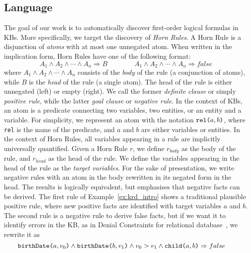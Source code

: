 \subsection{Language} \label{sec:krd_language} 
The goal of our work is to automatically discover first-order logical formulas in KBs. More specifically, we target the discovery of \emph{Horn Rules}. A Horn Rule is a disjunction of \emph{atoms} with at most one unnegated atom. When written in the implication form, Horn Rules have one of the following format:
%
\begin{equation*}
A_1 \wedge A_2 \wedge \cdots \wedge A_n \Rightarrow B \qquad \qquad A_1 \wedge A_2 \wedge \cdots \wedge A_n \Rightarrow  false 
\end{equation*} %
%
where $A_1 \wedge A_2 \wedge \cdots \wedge A_n$ consists of the \emph{body} of the rule (a conjunction of atoms), while $B$ is the \emph{head} of the rule (a single atom). The head of the rule is either unnegated (left) or empty (right). We call the former \emph{definite clause} or simply \emph{positive rule}, while the latter \emph{goal clause} or \emph{negative rule}. In the context of KBs, an atom is a predicate connecting two variables, two entities, or an entity and a variable. For simplicity, we represent an atom with the notation $\texttt{rel(}a,b\texttt{)}$, where \texttt{rel} is the name of the predicate, and $a$ and $b$ are either variables or entities. In the context of Horn Rules, all variables appearing in a rule are implicitly universally quantified. Given a Horn Rule $r$, we define $r_{body}$ as the body of the rule, and $r_{head}$ as the head of the rule. We define the variables appearing in the head of the rule as the \emph{target variables}. For the sake of presentation, we write negative rules with an atom in the body rewritten in its negated form in the head. The results is logically equivalent, but emphasises that negative facts can be derived.
The first rule of Example~\ref{ex:krd_intro} shows a traditional plausible positive rule, where new positive facts are identified with target variables $a$ and $b$.
The second rule is a negative rule to derive false facts, but if we want it to identify errors in the KB, as in Denial Constraints for relational database~\cite{chu2013discovering}, we rewrite it as 	
\begin{equation*}
		 \hspace*{-0.45cm}   \atom{birthDate}{a}{v_0} \wedge \atom{birthDate}{b}{v_1} \wedge v_0 > v_1
		\wedge \atom{child}{a}{b} \Rightarrow false 
	\end{equation*}

